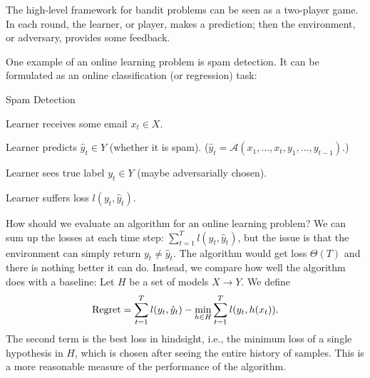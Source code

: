\documentclass[11pt]{article}
\begin{document}
The high-level framework for bandit problems can be seen as a two-player game. In each round, the learner, or player, makes a prediction; then the environment, or adversary, provides some feedback.


One example of an online learning problem is spam detection. It can be formulated as an online classification (or regression) task:

\begin{algorithm}
\caption{Spam Detection}
\begin{algorithmic}[1]

        \State Learner receives some email $x_t \in X$.

        \State Learner predicts $\hat{y}_t\in Y$ (whether it is spam). ($\hat{y}_t = \mathcal{A}(x_1, \dots, x_{t}, y_1, \dots, y_{t-1})$.) 
        
        \State Learner sees true label $y_t \in Y$ (maybe adversarially chosen).

        \State Learner suffers loss $l(y_t, \hat{y}_t)$.
    \EndFor
\EndProcedure
\end{algorithmic}
\end{algorithm}
How should we evaluate an algorithm for an online learning problem? We
can sum up the losses at each time step: $\sum_{t=1}^{T}{l(y_t,
  \hat{y}_t)}$, but the issue is that the environment can simply
return $y_t \ne  \hat{y}_t$. The algorithm would get loss $\Theta(T)$
and there is nothing better it can do. Instead, we compare how well
the algorithm does with a baseline: Let $H$ be a set of models $X
\rightarrow Y$. We define $${\rm Regret} = \sum_{t=1}^{T}{l(y_t, \hat{y}_t)}-\min_{h \in H}{\sum_{t=1}^{T}{l(y_t, h(x_t))}}.$$ The second term is the best loss in hindsight, i.e., the minimum loss of a single hypothesis in $H$, which is chosen after seeing the entire history of samples. This is a more reasonable measure of the performance of the algorithm.

\end{document}
